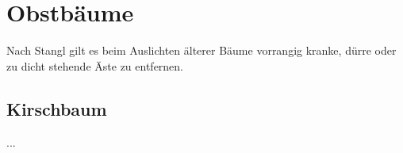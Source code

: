 \pagebreak

\section{Obstbäume}
\label{Bäume}

Nach Stangl \cite[S.~256]{Stangl1995} gilt es beim Auslichten älterer Bäume vorrangig kranke, dürre oder zu dicht stehende Äste zu entfernen.

\subsection{Kirschbaum}
...



\pagebreak